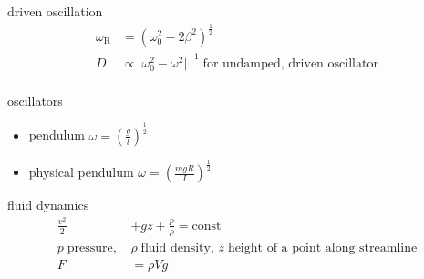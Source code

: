 \documentclass[avery5388, frame, grid]{flashcards}
\begin{document}
\begin{flashcard}{driven oscillation}
  {
    \begin{align*}
      \omega_{\textrm{R}} &= (\omega_{0}^{2} - 2 \beta^{2})^{\frac{1}{2}}\\
      D &\propto {\vert \omega_{0}^{2} - \omega^{2} \vert}^{-1} \; \textrm{for undamped, driven oscillator}\\
    \end{align*}
  }
\end{flashcard}

\begin{flashcard}{oscillators}
  {
    \begin{itemize}
    \item pendulum $\omega = (\frac{g}{l})^{\frac{1}{2}}$
    \item physical pendulum $\omega = (\frac{mgR}{I})^{\frac{1}{2}}$
    \end{itemize}
  }
\end{flashcard}

\begin{flashcard}{fluid dynamics}
  {
    \begin{align*}
      \frac{v^2}{2} &+ g z + \frac{p}{\rho} = \textrm{const}\\
      p \; \textrm{pressure, } &\rho \; \textrm{fluid density, } z \; \textrm{height of a point along streamline}\\
      F & = \rho V g\\
    \end{align*}
  }
\end{flashcard}
\end{document}
